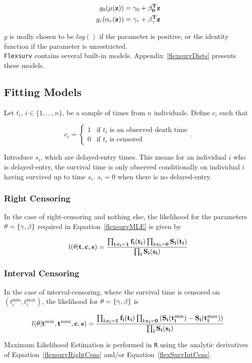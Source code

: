 \begin{align}
    \label{flexsurvMLE}
    g_0(\mu(\bf{z})) &= \gamma_0 + \bf{\beta}_0^Tz \nonumber \\
    g_r(\alpha_r(\bf{z})) &= \gamma_r + \bf{\beta}_{\gamma}^T\bf{z}
\end{align}

$g$ is usally chosen to be $log()$ if the parameter is positive, or the identity function if the parameter is unrestricted.\\

\verb|Flexsurv| contains several built-in models. Appendix~\ref{flexsurvDists} presents these models.

\subsection{Fitting Models}
Let $t_i$, $i \in \{1, \ldots, n\}$, be a sample of times from $n$ individuals. Define $c_i$ such that 

\[
    c_i = \begin{cases*}
        1 & \text{if $t_i$ is an observed death time} \\
        0 & \text{if $t_i$ is censored} 
    \end{cases*}  
.\]

Introduce $s_i$, which are delayed-entry times. This means for an individual $i$ who is delayed-entry, the survival time is only observed conditionally on individual $i$ having survived up to time $s_i$. $s_i = 0$ when there is no delayed-entry. \\

\subsubsection{Right Censoring}
In the case of right-censoring and nothing else, the likelihood for the parameters $\bf{\theta} = \{\bf{\gamma}, \bf{\beta}\}$ required in Equation~\ref{flexsurvMLE} is given by 

\begin{equation}
    \label{flexsurvRightCens}
    l(\bf{\theta}|\bf{t},\bf{c},\bf{s}) = \frac{\prod_{i:c_i=1} f_i(t_i) \prod_{i:c_i=0} S_i(t_i)}{\prod_{i} S_i(s_i)}
\end{equation}

\subsubsection{Interval Censoring}
In the case of interval-censoring, where the survival time is censored on $(t_i^{\text{min}}, t_i^{\text{max}})$, the likelihood for $\bf{\theta} = \{\bf{\gamma}, \bf{\beta}\}$ is 

\begin{equation}
    \label{flexSurvIntCens}
    l(\bf{\theta}|\bf{t^\text{min}}, \bf{t^\text{max}}, \bf{c},\bf{s}) = \frac{\prod_{i:c_i=1} f_i(t_i) \prod_{i:c_i=0} \left(S_i(t_i^{\text{min}}) - S_i(t_i^{\text{max}}) \right)}{\prod_{i} S_i(s_i)}
\end{equation}

Maximum Likelihood Estimation is performed in \verb|R| using the analytic derivatives of Equation~\ref{flexsurvRightCens} and/or Equation~\ref{flexSurvIntCens}. 